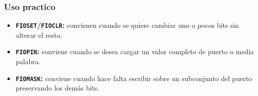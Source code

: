 \subsubsection{Uso practico}
\begin{itemize}
  \item \textbf{\texttt{FIOSET}/\texttt{FIOCLR}:} convienen cuando se quiere cambiar uno o pocos bits sin alterar el resto.
  \item \textbf{\texttt{FIOPIN}:} conviene cuando se desea cargar un valor completo de puerto o media palabra.
  \item \textbf{\texttt{FIOMASK}:} conviene cuando hace falta escribir sobre un subconjunto del puerto preservando los demás bits.
\end{itemize}
